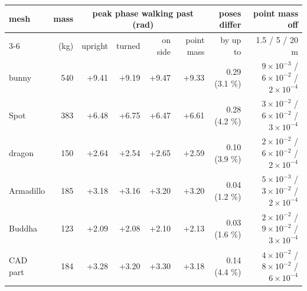 \begin{tabular}{lrrrrrrr}
\toprule
mesh & mass & \multicolumn{4}{c}{peak phase walking past (rad)} & poses differ & point mass off \\
\cmidrule(lr){3-6}
 & (kg) & upright & turned & on side & point mass & by up to & 1.5 / 5 / 20 m \\
\midrule
bunny & 540 & +9.41 & +9.19 & +9.47 & +9.33 & 0.29 (3.1 \%) & $9\times10^{-3}$ / $6\times10^{-2}$ / $2\times10^{-4}$ \\
Spot & 383 & +6.48 & +6.75 & +6.47 & +6.61 & 0.28 (4.2 \%) & $3\times10^{-2}$ / $6\times10^{-2}$ / $3\times10^{-4}$ \\
dragon & 150 & +2.64 & +2.54 & +2.65 & +2.59 & 0.10 (3.9 \%) & $2\times10^{-2}$ / $6\times10^{-2}$ / $2\times10^{-4}$ \\
Armadillo & 185 & +3.18 & +3.16 & +3.20 & +3.20 & 0.04 (1.2 \%) & $5\times10^{-3}$ / $3\times10^{-2}$ / $2\times10^{-4}$ \\
Buddha & 123 & +2.09 & +2.08 & +2.10 & +2.13 & 0.03 (1.6 \%) & $2\times10^{-2}$ / $9\times10^{-2}$ / $3\times10^{-4}$ \\
CAD part & 184 & +3.28 & +3.20 & +3.30 & +3.18 & 0.14 (4.4 \%) & $4\times10^{-2}$ / $8\times10^{-2}$ / $6\times10^{-4}$ \\
\bottomrule
\end{tabular}
